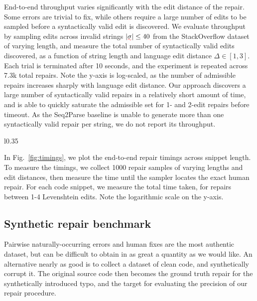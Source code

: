 \documentclass[sigplan,review,anonymous,acmsmall]{acmart}\settopmatter{printfolios=false,printccs=false,printacmref=false}
\begin{document}
  End-to-end throughput varies significantly with the edit distance of the repair. Some errors are trivial to fix, while others require a large number of edits to be sampled before a syntactically valid edit is discovered. We evaluate throughput by sampling edits across invalid strings $|\err\sigma| \leq 40$ from the StackOverflow dataset of varying length, and measure the total number of syntactically valid edits discovered, as a function of string length and language edit distance $\Delta\in[1, 3]$. Each trial is terminated after 10 seconds, and the experiment is repeated across 7.3k total repairs. Note the y-axis is log-scaled, as the number of admissible repairs increases sharply with language edit distance. Our approach discovers a large number of syntactically valid repairs in a relatively short amount of time, and is able to quickly saturate the admissible set for 1- and 2-edit repairs before timeout. As the Seq2Parse baseline is unable to generate more than one syntactically valid repair per string, we do not report its throughput.

  \begin{wrapfigure}{l}{0.35\textwidth}
    \resizebox{.35\textwidth}{!}{}
    \caption{End-to-end repair timings across snippet length.}
    \label{fig:timings}
    \vspace{-25pt}
  \end{wrapfigure}

  In Fig.~\ref{fig:timings}, we plot the end-to-end repair timings across snippet length. To measure the timings, we collect 1000 repair samples of varying lengths and edit distances, then measure the time until the sampler locates the exact human repair. For each code snippet, we measure the total time taken, for repairs between 1-4 Levenshtein edits. Note the logarithmic scale on the y-axis.

  \subsection{Synthetic repair benchmark}\label{sec:latency}

  Pairwise naturally-occurring errors and human fixes are the most authentic dataset, but can be difficult to obtain in as great a quantity as we would like. An alternative nearly as good is to collect a dataset of clean code, and synthetically corrupt it. The original source code then becomes the ground truth repair for the synthetically introduced typo, and the target for evaluating the precision of our repair procedure.
\end{document}
